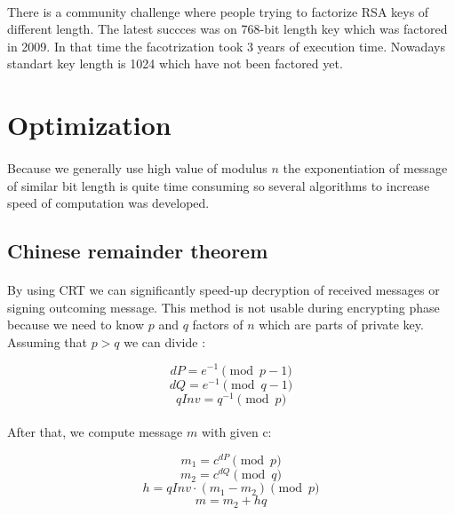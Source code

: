 \documentclass[thesis=B,english]{FITthesis}[2012/10/20]
\begin{document}
{{\paragraph*{}{
There is a community challenge where people trying to factorize RSA keys of different length. The latest succces was on 768-bit length key which was factored in 2009. In that time the facotrization took 3 years of execution time. Nowadays standart key length is 1024 which have not been factored yet.\cite{challenge}
}


\section{Optimization}
\paragraph*{}
{Because we generally use high value of modulus \(n\) the exponentiation of message of similar bit length is quite time consuming so several algorithms to increase speed of computation was developed.}

\subsection{Chinese remainder theorem}

\paragraph*{}
{By using CRT we can significantly speed-up decryption of received messages or signing outcoming message. This method is not usable during encrypting phase because we need to know \(p\) and \(q\) factors of \(n\) which are parts of private key.
Assuming that \(p>q\) we can divide :}

\[dP = e^{-1} \pmod{p-1}\]
\[dQ = e^{-1} \pmod{q-1}\]
\[qInv = q^{-1} \pmod{p}\]

\paragraph*{}
{After that, we compute message \(m\) with given c:}

\[m_1 = c^{dP} \pmod{p}\]
\[m_2 = c^{dQ} \pmod{q}\]
\[h = qInv \cdot (m_1 - m_2) \pmod{p}\]  
\[m = m_2 + hq\]

}}
\end{document}
